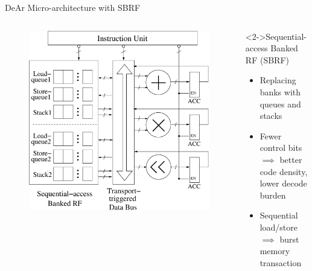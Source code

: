 \documentclass[handout]{beamer}
\begin{document}
\begin{CJK}{UTF8}{bkai}
            \begin{frame}{DeAr Micro-architecture with SBRF}
                \begin{columns}
                    \begin{column}{0.6\textwidth}
                        \begin{figure}[!ht] 
                            \centering
                            \includegraphics[width=1.0\textwidth]{./figs/micro.eps}
                        \end{figure}
                    \end{column}
                    \begin{column}{0.35\textwidth}
                        \begin{block}<2->{Sequential-access Banked RF (SBRF)}
                            \begin{itemize}
                                \item <3->{Replacing banks with queues and stacks}
                                \item <4->{Fewer control bits\\
                                    $\implies$ better code density, lower decode burden}
                                \item <5->{Sequential load/store \\
                                    $\implies$ burst memory transaction}
                            \end{itemize}    
                        \end{block}
                    \end{column}
                \end{columns}
            \end{frame}


\end{CJK}
\end{document}
